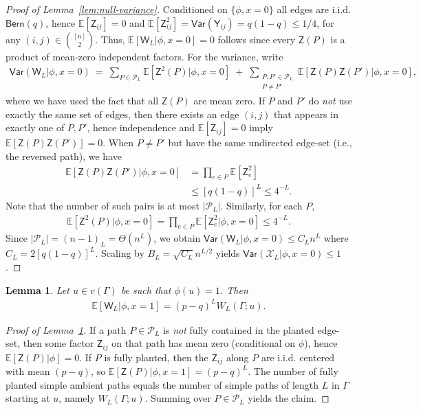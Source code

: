 \documentclass[12pt]{article}
\newcommand{\bE}{\mathbb{E}}
\newtheorem{lemma}{Lemma}
\newcommand{\pp}[1]{\left[#1\right]}
\newcommand{\s}[1]{\mathsf{#1}}
\begin{document}
\begin{proof}[Proof of Lemma~\ref{lem:null-variance}]
Conditioned on $\{\phi,x=0\}$ all edges are i.i.d. $\s{Bern}(q)$, hence $\bE[\s{Z}_{ij}]=0$ and
$\bE[\s{Z}_{ij}^2]=\s{Var}(\s{Y}_{ij})=q(1-q)\le 1/4$, for any $(i,j)\in\binom{[n]}{2}$. Thus, $\bE[\s{W}_L\vert \phi,x=0]=0$ follows since every $\s{Z}(P)$ is a product of mean-zero independent factors. For the variance, write
\begin{align}
\s{Var}(\s{W}_L\vert \phi,x=0)\ =\ \sum_{P\in\mathcal{P}_L}\bE[\s{Z}^2(P)\vert \phi,x=0]
\;+\;\sum_{\substack{P,P'\in\mathcal{P}_L\\ P\neq P'}} \bE[\s{Z}(P)\s{Z}(P')\vert \phi,x=0],
\end{align}
where we have used the fact that all $\s{Z}(P)$ are mean zero. If $P$ and $P'$ do \emph{not} use exactly the same set of edges, then there exists an edge $(i,j)$ that appears in exactly one of $P,P'$, hence independence and $\bE[\s{Z}_{ij}]=0$ imply $\bE[\s{Z}(P)\s{Z}(P')]=0$. When $P\neq P'$ but have the same undirected edge-set (i.e., the reversed path), we have
\begin{align}
    \bE[\s{Z}(P)\s{Z}(P')\vert \phi,x=0]&=\prod_{e\in P}\bE[\s{Z}_e^2]\\
    &\leq [q(1-q)]^{L}\leq 4^{-L}.
\end{align}
Note that the number of such pairs is at most $|\mathcal{P}_L|$. Similarly, for each $P$, 
\begin{align}
\bE[\s{Z}^2(P)\vert \phi,x=0]=\prod_{e\in P}\bE[\s{Z}_e^2\vert \phi,x=0]\leq 4^{-L}.
\end{align}
Since $|\mathcal{P}_L|=(n-1)_{L}=\Theta(n^L)$, we obtain $\s{Var}(\s{W}_L\vert \phi,x=0)\leq C_L n^L$ where $C_L = 2[q(1-q)]^{L}$. Scaling by $B_L=\sqrt{C_L} n^{L/2}$ yields $\s{Var}(\mathscr{X}_L\vert \phi,x=0)\leq 1$. 
\end{proof}

\begin{lemma}\label{lem:planted-mean}
Let $u\in v(\Gamma)$ be such that $\phi(u)=1$. Then
\begin{align}
\bE\pp{\s{W}_L\vert \phi,x=1}=(p-q)^LW_L(\Gamma;u).
\end{align}
\end{lemma}

\begin{proof}[Proof of Lemma~\ref{lem:planted-mean}]
If a path $P\in\mathcal{P}_L$ is \emph{not} fully contained in the planted edge-set, then some factor
$\s{Z}_{ij}$ on that path has mean zero (conditional on $\phi$), hence $\bE[\s{Z}(P)\vert \phi]=0$.
If $P$ is fully planted, then the $\s{Z}_{ij}$ along $P$ are i.i.d. centered with mean $(p-q)$,
so $\bE[\s{Z}(P)\vert \phi,x=1]=(p-q)^L$. The number of fully planted simple ambient paths equals the number of simple paths of length $L$ in $\Gamma$ starting at $u$, namely $W_L(\Gamma;u)$.  Summing over $P\in\mathcal{P}_L$ yields the claim.
\end{proof}
\end{document}
